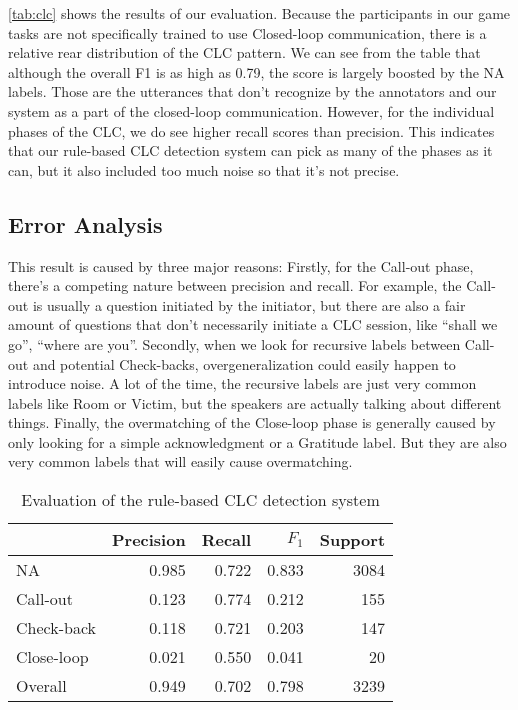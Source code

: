 \autoref{tab:clc} shows the results of our evaluation. Because the participants
in our game tasks are not specifically trained to use Closed-loop
communication, there is a relative rear distribution of the CLC pattern. We can
see from the table that although the overall F1 is as high as 0.79, the score
is largely boosted by the NA labels. Those are the utterances that don’t
recognize by the annotators and our system as a part of the closed-loop
communication.  However, for the individual phases of the CLC, we do see higher
recall scores than precision. This indicates that our rule-based CLC detection
system can pick as many of the phases as it can, but it also included too much
noise so that it’s not precise. 

\subsection{Error Analysis}

This result is caused by three major reasons: Firstly, for the Call-out phase,
there’s a competing nature between precision and recall. For example, the
Call-out is usually a question initiated by the initiator, but there are also a
fair amount of questions that don’t necessarily initiate a CLC session, like
``shall we go'', ``where are you''.  Secondly, when we look for recursive labels
between Call-out and potential Check-backs, overgeneralization could easily
happen to introduce noise. A lot of the time, the recursive labels are just
very common labels like Room or Victim, but the speakers are actually talking
about different things. Finally, the overmatching of the Close-loop phase is
generally caused by only looking for a simple acknowledgment or a Gratitude
label. But they are also very common labels that will easily cause
overmatching.



\begin{table}
    \centering
    \begin{tabular}{lrrrr}
        \toprule
                   & Precision & Recall & $F_1$ & Support\\\midrule
        NA         & 0.985     & 0.722  & 0.833 & 3084\\
        Call-out   & 0.123     & 0.774  & 0.212 & 155 \\
        Check-back & 0.118     & 0.721  & 0.203 & 147\\
        Close-loop & 0.021     & 0.550  & 0.041 & 20\\
        Overall    & 0.949     & 0.702  & 0.798 & 3239\\
        \bottomrule
    \end{tabular}
    \caption{Evaluation of the rule-based CLC detection system}
    \label{tab:clc}
\end{table}

